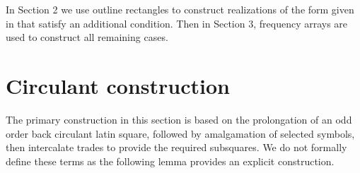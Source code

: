 \documentclass{sn-jnl}
\theoremstyle{definition}
\begin{document}
In Section 2 we use outline rectangles to construct realizations of the form given in  that satisfy an additional condition. Then in Section 3, frequency arrays are used to construct all remaining cases.







\section{Circulant construction}

The primary construction in this section is based on the prolongation of an odd order back circulant latin square, followed by amalgamation of selected symbols, then intercalate trades to provide the required subsquares. We do not formally define these terms as the following lemma provides an explicit construction.
\end{document}
